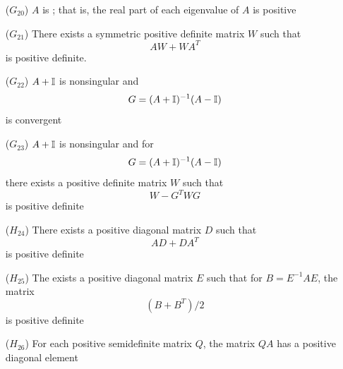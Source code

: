 \documentclass[aspectratio=169]{beamer}
\begin{document}
\begin{frame}
\addtocounter{theorem}{-1}
\begin{theorem}[Continued]
\begin{enumerate}
\item[($G_{20}$)] $A$ is ; that is, the real part of each eigenvalue of $A$ is positive
\item[($G_{21}$)] There exists a symmetric positive definite matrix $W$ such that
\[
AW+WA^T
\]
is positive definite.
\item[($G_{22}$)] $A+\mathbb{I}$ is nonsingular and
\[
G=(A+\mathbb{I})^{-1}(A-\mathbb{I})
\]
is convergent
\end{enumerate}
\end{theorem}
\end{frame}

\begin{frame}
\addtocounter{theorem}{-1}
\begin{theorem}[Continued]
\begin{enumerate}
\item[($G_{23}$)] $A+\mathbb{I}$ is nonsingular and for 
\[
G=(A+\mathbb{I})^{-1}(A-\mathbb{I})
\]
there exists a positive definite matrix $W$ such that
\[
W-G^TWG
\]
is positive definite
\end{enumerate}
\end{theorem}
\end{frame}

\begin{frame}
\addtocounter{theorem}{-1}
\begin{theorem}[Continued]
\begin{enumerate}
\item[($H_{24}$)] There exists a positive diagonal matrix $D$ such that 
\[
AD+DA^T
\]
is positive definite
\item[($H_{25}$)] The exists a positive diagonal matrix $E$ such that for $B=E^{-1}AE$, the matrix
\[
(B+B^T)/2
\]
is positive definite
\item[($H_{26}$)] For each positive semidefinite matrix $Q$, the matrix $QA$ has a positive diagonal element
\end{enumerate}
\end{theorem}
\end{frame}
\end{document}
